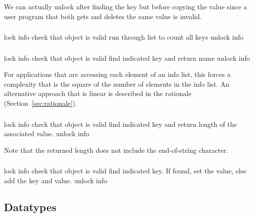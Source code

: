 \documentclass{article}
\begin{document}
We can actually unlock after finding the key but before copying the
value since a user program that both gets and deletes the same value
is invalid.

\subsubsection{}
\begin{algorithm}
lock info
check that object is valid
run through list to count all keys
unlock info
\end{algorithm}

\subsubsection{}
\begin{algorithm}
lock info
check that object is valid
find indicated key and return name
unlock info
\end{algorithm}

For applications that are accessing each element of an info list, this forces
a complexity that is the square of the number of elements in the info list.  
An alternative approach that is linear is described in the rationale (Section~\ref{sec:rationale}).

\subsubsection{}
\begin{algorithm}
lock info
check that object is valid
find indicated key and return length of the associated value.
unlock info
\end{algorithm}
Note that the returned length does not include the end-of-string character.

\subsubsection{}
\begin{algorithm}
lock info
check that object is valid
find indicated key.  
If found, set the value,
else add the key and value.
unlock info
\end{algorithm}


\subsection{Datatypes}
\label{sec:datatypes}
\end{document}
